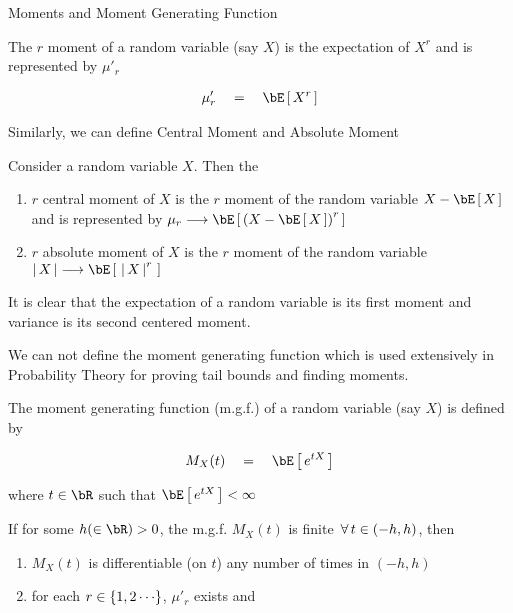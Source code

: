 \documentclass{article}
\begin{document}
\begin{ssection}{Moments and Moment Generating Function}

	\begin{definition}[Moment]
		The $r$\tth{} moment of a random variable (say $X$) is the expectation of $X^r$ and is represented by $\mu'_r$

		\begin{align*}
			\mu'_r	\eq	\E{X^r}
		\end{align*}
	\end{definition}

	Similarly, we can define Central Moment and Absolute Moment

	\begin{definition}
		Consider a random variable $X$. Then the

		\begin{enumerate}[label=(\roman*)]
			\item {} $r$\tth{} central moment of $X$ is the $r$\tth{} moment of the random variable $X - \E{X}$ and is represented by $\mu_r \lra \E{\para{X - \E{X}}^r}$
			\item {} $r$\tth{} absolute moment of $X$ is the $r$\tth{} moment of the random variable $\abs{X} \lra \E{\,\abs{X}^r\,}$
		\end{enumerate}
	\end{definition}

	It is clear that the expectation of a random variable is its first moment and variance is its second centered moment. \br

	We can not define the moment generating function which is used extensively in Probability Theory for proving tail bounds and finding moments.

	\begin{definition}
		The moment generating function (m.g.f.) of a random variable (say $X$) is defined by

		\begin{align*}
			M_X(t)	\eq	\E{\exp{tX}}
		\end{align*}

		where $t \in \bR$ such that $\E{\exp{tX}} < \infty$
	\end{definition}

	\begin{result}
		If for some $h (\in \bR) > 0$, the m.g.f. $M_X(t)$ is finite $\,\forall\, t \in (-h, h)$, then

		\begin{enumerate}[label=(\roman*)]
			\item $M_X(t)$ is differentiable (on $t$) any number of times in $(-h, h)$
			\item for each $r \in \left\{ {1, 2 \cdots} \right\}$, $\mu'_r$ exists and


\end{enumerate}
\end{result}
\end{ssection}
\end{document}
